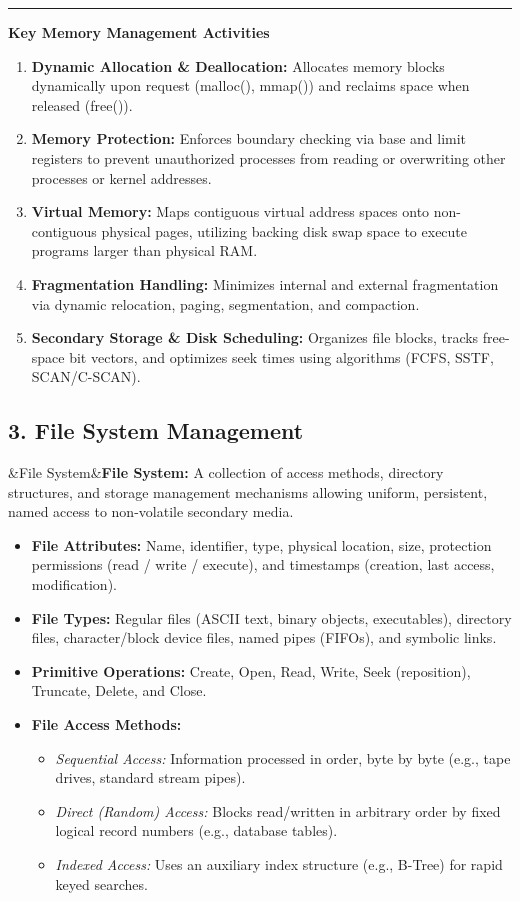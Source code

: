 \documentclass[11pt,a4paper]{article}
\newcommand{\ic}[1]{\mbox{\colorbox{AnthCodeBG}{\footnotesize\ttfamily\textcolor{AnthBlue}{#1}}}}
\newcommand{\concept}[1]{%
  \noindent\textcolor{AnthGreen}{\rule{3pt}{10pt}}\enspace
  \textbf{\color{AnthDark}#1}\par\vspace{2pt}%
}
\newenvironment{Def}[1][]{\begin{tcolorbox}[defbox]\ifx&#1&\else\textbf{#1:}\enspace\fi}{\end{tcolorbox}}
\begin{document}
\concept{Key Memory Management Activities}
\begin{enumerate}
    \item \textbf{Dynamic Allocation \& Deallocation:} Allocates memory blocks dynamically upon request (\ic{malloc()}, \ic{mmap()}) and reclaims space when released (\ic{free()}).
    \item \textbf{Memory Protection:} Enforces boundary checking via base and limit registers to prevent unauthorized processes from reading or overwriting other processes or kernel addresses.
    \item \textbf{Virtual Memory:} Maps contiguous virtual address spaces onto non-contiguous physical pages, utilizing backing disk swap space to execute programs larger than physical RAM.
    \item \textbf{Fragmentation Handling:} Minimizes internal and external fragmentation via dynamic relocation, paging, segmentation, and compaction.
    \item \textbf{Secondary Storage \& Disk Scheduling:} Organizes file blocks, tracks free-space bit vectors, and optimizes seek times using algorithms (FCFS, SSTF, SCAN/C-SCAN).
\end{enumerate}

\subsection{3. File System Management}

\begin{Def}[File System]
A collection of access methods, directory structures, and storage management mechanisms allowing uniform, persistent, named access to non-volatile secondary media.
\end{Def}

\begin{itemize}
    \item \textbf{File Attributes:} Name, identifier, type, physical location, size, protection permissions (read / write / execute), and timestamps (creation, last access, modification).
    \item \textbf{File Types:} Regular files (ASCII text, binary objects, executables), directory files, character/block device files, named pipes (FIFOs), and symbolic links.
    \item \textbf{Primitive Operations:} Create, Open, Read, Write, Seek (reposition), Truncate, Delete, and Close.
    \item \textbf{File Access Methods:}
    \begin{itemize}
        \item \emph{Sequential Access:} Information processed in order, byte by byte (e.g., tape drives, standard stream pipes).
        \item \emph{Direct (Random) Access:} Blocks read/written in arbitrary order by fixed logical record numbers (e.g., database tables).
        \item \emph{Indexed Access:} Uses an auxiliary index structure (e.g., B-Tree) for rapid keyed searches.
    \end{itemize}
\end{itemize}
\end{document}
